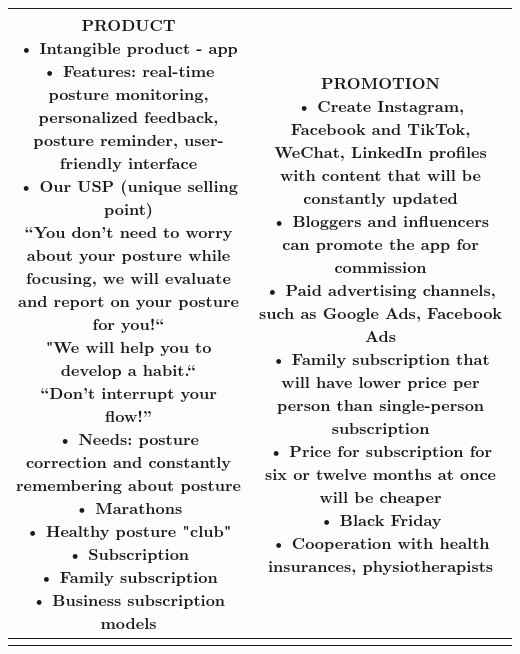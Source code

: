\begin{table}[H]
    \centering
    \small
    \begin{tabular}{|c|c|}
        \hline
        \parbox{8cm}{\vspace{5pt}
        \textbf{PRODUCT}\\
        •	Intangible product - app\\
        •	Features: real-time posture monitoring, personalized feedback, posture reminder, user-friendly interface\\
        •	Our USP (unique selling point)\\
            “You don’t need to worry about your posture while focusing, we will evaluate and report on your posture for you!“\\
            "We will help you to develop a habit.“\\
            “Don’t interrupt your flow!”\\
        •	Needs: posture correction and constantly remembering about posture\\
        •	Marathons\\
        •	Healthy posture "club"\\
        •	Subscription\\
        •	Family subscription\\
        •	Business subscription models\\
        \vspace{5pt}} & \parbox{7cm}{\vspace{5pt}
        \textbf{PROMOTION}\\
        •	Create Instagram, Facebook and TikTok, WeChat, LinkedIn profiles with content that will be constantly updated\\
        •	Bloggers and influencers can promote the app for commission\\
        •	Paid advertising channels, such as Google Ads, Facebook Ads\\
        •	Family subscription that will have lower price per person than single-person subscription\\
        •	Price for subscription for six or twelve months at once will be cheaper\\
        •	Black Friday\\
        •	Cooperation with health insurances, physiotherapists   \\     
        \vspace{5pt}} \\
    \hline
    \parbox{8cm}{\vspace{5pt}
}
\end{tabular}
\end{table}

